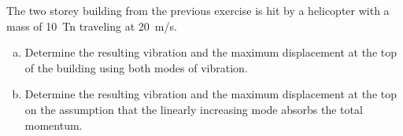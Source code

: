 
\begin{Exercise}[label={two_storey_helicopter}]
The two storey building from the previous exercise is hit by a helicopter with a mass of \SI{10}{Tn} traveling at \SI{20}{m/s}.
\begin{enumerate}[(a)]
    \item Determine the resulting vibration and the maximum displacement at the top of the building using both modes of vibration.
    \item Determine the resulting vibration and the maximum displacement at the top on the assumption that the linearly increasing mode absorbs the total momentum.
\end{enumerate}
\shortAnswer
\end{Exercise}



\begin{Answer}[ref={two_storey_helicopter}]
\end{Answer}
